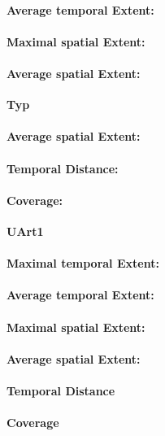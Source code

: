 \paragraph{Average temporal Extent:}
\paragraph{Maximal spatial Extent:}
\paragraph{Average spatial Extent:}

\large
\centerline{\textbf{Typ}}
\normalsize

\paragraph{Average spatial Extent:}
\paragraph{Temporal Distance:}
\paragraph{Coverage:}

\large
\centerline{\textbf{UArt1}}
\normalsize

\paragraph{Maximal temporal Extent:}
\paragraph{Average temporal Extent:}
\paragraph{Maximal spatial Extent:}
\paragraph{Average spatial Extent:}
\paragraph{Temporal Distance}
\paragraph{Coverage}
